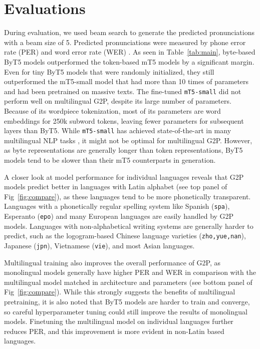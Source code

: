 \documentclass[a4paper]{article}
\begin{document}
\section{Evaluations}
During evaluation, we used beam search to generate the predicted pronunciations with a beam size of 5. Predicted pronunciations were measured by phone error rate (PER) and word error rate (WER) \cite{yu2020multilingual}. As seen in Table~\ref{tab:main},  byte-based ByT5 models outperformed the token-based mT5 models by a significant margin. Even for tiny ByT5 models that were randomly initialized, they still outperformed the mT5-small model that had more than 10 times of parameters and had been pretrained on massive texts. The fine-tuned \texttt{mT5-small} did not perform well on multilingual G2P, despite its large number of parameters. Because of its wordpiece tokenization, most of its parameters are word embeddings for 250k subword tokens, leaving fewer parameters for subsequent layers than ByT5. While \texttt{mT5-small} has achieved state-of-the-art in many multilingual NLP tasks \cite{xue2021mt5}, it might not be optimal for multilingual G2P. 
However, as byte representations are generally longer than token representations, ByT5 models tend to be slower than their mT5 counterparts in generation. 

A closer look at model performance for individual languages reveals that G2P models predict better in languages with Latin alphabet (see top panel of Fig~\ref{fig:compare}), as these languages tend to be more phonetically transparent. Languages with a phonetically regular spelling system like Spanish (\texttt{spa}), Esperanto (\texttt{epo}) and many European languages are easily handled by G2P models. Languages with non-alphabetical writing systems are generally harder to predict, such as the logogram-based Chinese language varieties (\texttt{zho,yue,nan}), Japanese (\texttt{jpn}), Vietnamese (\texttt{vie}), and most Asian languages. 

Multilingual training also improves the overall performance of G2P, as monolingual models generally have higher PER and WER in comparison with the multilingual model matched in architecture and parameters (see bottom panel of Fig~\ref{fig:compare}). While this strongly suggests the benefits of multilingual pretraining, it is also noted that ByT5 models are harder to train and converge, so careful hyperparameter tuning could still improve the results of monolingual models. Finetuning the multilingual model on individual languages further reduces PER, and this improvement is more evident in non-Latin based languages. 
\end{document}
